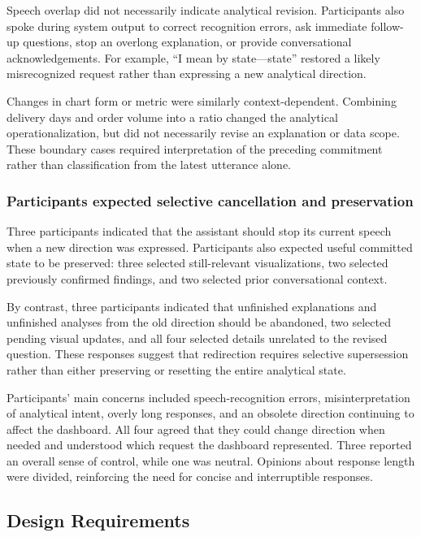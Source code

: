 \documentclass[journal]{IEEEtran}
\begin{document}
Speech overlap did not necessarily indicate analytical revision. Participants
also spoke during system output to correct recognition errors, ask immediate
follow-up questions, stop an overlong explanation, or provide conversational
acknowledgements. For example, ``I mean by state---state'' restored a likely
misrecognized request rather than expressing a new analytical direction.

Changes in chart form or metric were similarly context-dependent. Combining
delivery days and order volume into a ratio changed the analytical
operationalization, but did not necessarily revise an explanation or data
scope. These boundary cases required interpretation of the preceding
commitment rather than classification from the latest utterance alone.

\subsubsection{Participants expected selective cancellation and preservation}

Three participants indicated that the assistant should stop its current speech
when a new direction was expressed. Participants also expected useful
committed state to be preserved: three selected still-relevant visualizations,
two selected previously confirmed findings, and two selected prior
conversational context.

By contrast, three participants indicated that unfinished explanations and
unfinished analyses from the old direction should be abandoned, two selected
pending visual updates, and all four selected details unrelated to the revised
question. These responses suggest that redirection requires selective
supersession rather than either preserving or resetting the entire analytical
state.

Participants' main concerns included speech-recognition errors,
misinterpretation of analytical intent, overly long responses, and an obsolete
direction continuing to affect the dashboard. All four agreed that they could
change direction when needed and understood which request the dashboard
represented. Three reported an overall sense of control, while one was
neutral. Opinions about response length were divided, reinforcing the need for
concise and interruptible responses.

\subsection{Design Requirements}
\label{sec:design-requirements}
\end{document}
